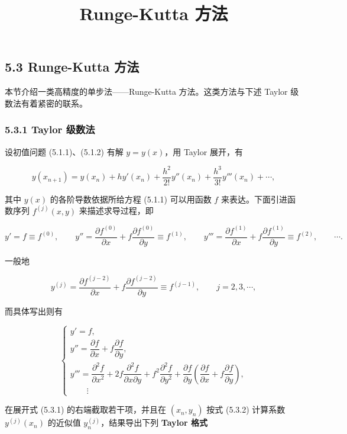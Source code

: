 \documentclass[
  10pt,
  fontset=fandol]{ctexart}
\title{Runge-Kutta 方法}
\author{}
\date{}
\begin{document}
\maketitle

\subsection{5.3 Runge-Kutta 方法}\label{runge-kutta-ux65b9ux6cd5}

本节介绍一类高精度的单步法------Runge-Kutta 方法。这类方法与下述 Taylor 级数法有着紧密的联系。

\subsubsection{5.3.1 Taylor 级数法}\label{taylor-ux7ea7ux6570ux6cd5}

设初值问题 (5.1.1)、(5.1.2) 有解 \(y=y(x)\)，用 Taylor 展开，有

\[
y(x_{n+1})=y(x_n)+hy'(x_n)+\frac{h^2}{2!}y''(x_n)+\frac{h^3}{3!}y'''(x_n)+\cdots,\tag{5.3.1}
\]

其中 \(y(x)\) 的各阶导数依据所给方程 (5.1.1) 可以用函数 \(f\) 来表达。下面引进函数序列 \(f^{(j)}(x,y)\) 来描述求导过程，即

\[
y'=f\equiv f^{(0)},\qquad
y''=\frac{\partial f^{(0)}}{\partial x}+f\frac{\partial f^{(0)}}{\partial y}\equiv f^{(1)},\qquad
y'''=\frac{\partial f^{(1)}}{\partial x}+f\frac{\partial f^{(1)}}{\partial y}\equiv f^{(2)},\qquad\cdots.
\]

一般地

\[
y^{(j)}=\frac{\partial f^{(j-2)}}{\partial x}+f\frac{\partial f^{(j-2)}}{\partial y}\equiv f^{(j-1)},\qquad j=2,3,\cdots,
\]

而具体写出则有

\[
\begin{cases}
y'=f,\\
y''=\dfrac{\partial f}{\partial x}+f\dfrac{\partial f}{\partial y},\\
y'''=\dfrac{\partial^2f}{\partial x^2}+2f\dfrac{\partial^2f}{\partial x\partial y}
+f^2\dfrac{\partial^2f}{\partial y^2}
+\dfrac{\partial f}{\partial y}\left(\dfrac{\partial f}{\partial x}+f\dfrac{\partial f}{\partial y}\right),\\
\qquad\vdots
\end{cases}\tag{5.3.2}
\]

在展开式 (5.3.1) 的右端截取若干项，并且在 \((x_n,y_n)\) 按式 (5.3.2) 计算系数 \(y^{(j)}(x_n)\) 的近似值 \(y_n^{(j)}\)，结果导出下列 \textbf{Taylor 格式}
\end{document}
